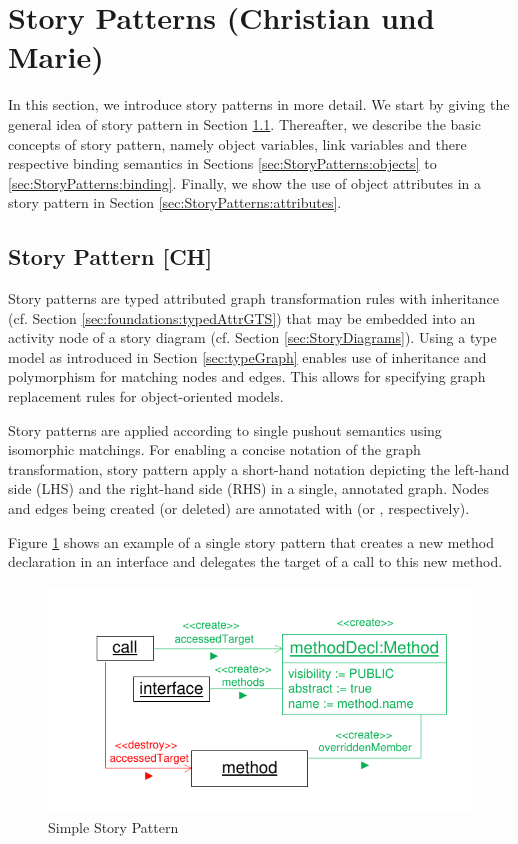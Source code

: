 \section{Story Patterns (Christian und Marie)} \label{sec:StoryPatterns}

In this section, we introduce story patterns in more detail. We start by giving the general idea of story pattern in Section \ref{sec:StoryPatterns:storyPattern}. Thereafter, we describe the basic concepts of story pattern, namely object variables, link variables and there respective binding semantics in Sections \ref{sec:StoryPatterns:objects} to \ref{sec:StoryPatterns:binding}. Finally, we show the use of object attributes in a story pattern in Section \ref{sec:StoryPatterns:attributes}.


\subsection{Story Pattern [CH]}
\label{sec:StoryPatterns:storyPattern}

Story patterns are typed attributed graph transformation rules with inheritance (cf. Section \ref{sec:foundations:typedAttrGTS}) that may be embedded into an activity node of a story diagram (cf. Section \ref{sec:StoryDiagrams}). Using a type model as introduced in Section \ref{sec:typeGraph} enables use of inheritance and polymorphism for matching nodes and edges.
This allows for specifying graph replacement rules for object-oriented models.

Story patterns are applied according to single pushout semantics using isomorphic matchings.
For enabling a concise notation of the graph transformation, story pattern apply a short-hand notation depicting the left-hand side (LHS) and the right-hand side (RHS) in a single, annotated graph. Nodes and edges being created (or deleted) are annotated with \create (or  \destroy, respectively).

Figure \ref{fig:simpleStoryPattern} shows an example of a single story pattern that creates a new method declaration in an interface and delegates the target of a call to this new method.

\begin{figure}[htbp]
  \centering
  \includegraphics[scale=1.0]{figures/SimpleStoryPattern}
  \caption{Simple Story Pattern}
  \label{fig:simpleStoryPattern}
\end{figure}

